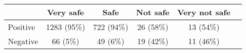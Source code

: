 \begin{tabular}{l c|c|c|c|c} \hline  & Very safe & Safe & Not safe & Very not safe \\ 
\hline Positive & 1283 (95\%) & 722 (94\%) & 26 (58\%) & 13 (54\%) \\ 
  Negative & 66 (5\%) & 49 (6\%) & 19 (42\%) & 11 (46\%) \\ 
 \hline \end{tabular}